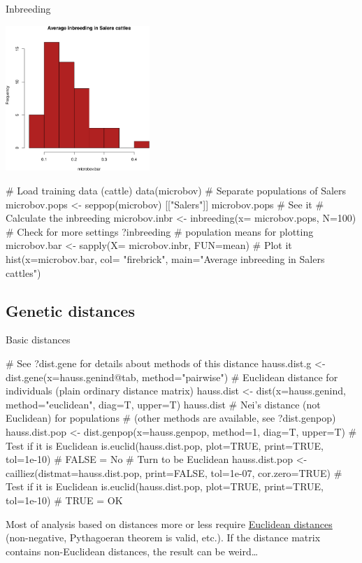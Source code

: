 \documentclass[compress, ucs, xelatex, 11pt, xcolor=svgnames,
  hyperref={
    bookmarks=true,
    unicode=true,
    colorlinks=true,
    pdftitle={Molecular data in R},
    plainpages=false,
    pdfauthor={Vojtech Zeisek},
    pdfsubject={Course about phylogeny and evolution in R},
    pdfcreator={XeLaTeX},
    pdfkeywords={R, evolution, phylogeny, molecular data},
    linkcolor=Tomato,
    anchorcolor=SaddleBrown,
    citecolor=Goldenrod,
    filecolor=DarkMagenta,
    menucolor=Sienna,
    urlcolor=DarkTurquoise,
    pdftex},
  url={hyphens, lowtilde} %
  ]{beamer}
\begin{document}
\begin{frame}[fragile]{Inbreeding}
\begin{multicols}{2}
  \includegraphics[height=5.5cm]{inbreeding.png}
  \begin{spluscode}
    # Load training data (cattle)
    data(microbov)
    # Separate populations of Salers
    microbov.pops <- seppop(microbov)
      [["Salers"]]
    microbov.pops # See it
    # Calculate the inbreeding
    microbov.inbr <- inbreeding(x=
      microbov.pops, N=100)
    # Check for more settings
    ?inbreeding
    # population means for plotting
    microbov.bar <- sapply(X=
      microbov.inbr, FUN=mean)
    # Plot it
    hist(x=microbov.bar, col=
      "firebrick", main="Average
      inbreeding in Salers cattles")
  \end{spluscode}
\end{multicols}

\end{frame}

\subsection{Genetic distances}

\begin{frame}[fragile]{Basic distances}
  \label{distances}
  \begin{spluscode}
    # See ?dist.gene for details about methods of this distance
    hauss.dist.g <- dist.gene(x=hauss.genind@tab, method="pairwise")
    # Euclidean distance for individuals (plain ordinary distance matrix)
    hauss.dist <- dist(x=hauss.genind, method="euclidean", diag=T, upper=T)
    hauss.dist
    # Nei's distance (not Euclidean) for populations
    # (other methods are available, see ?dist.genpop)
    hauss.dist.pop <- dist.genpop(x=hauss.genpop, method=1, diag=T, upper=T)
    # Test if it is Euclidean
    is.euclid(hauss.dist.pop, plot=TRUE, print=TRUE, tol=1e-10) # FALSE = No
    # Turn to be Euclidean
    hauss.dist.pop <- cailliez(distmat=hauss.dist.pop, print=FALSE,
      tol=1e-07, cor.zero=TRUE)
    # Test if it is Euclidean
    is.euclid(hauss.dist.pop, plot=TRUE, print=TRUE, tol=1e-10) # TRUE = OK
  \end{spluscode}
  \vfil
  Most of analysis based on distances more or less require \href{https://en.wikipedia.org/wiki/Euclidean_distance_matrix}{Euclidean distances} (non-negative, Pythagoeran theorem is valid, etc.). If the distance matrix contains non-Euclidean distances, the result can be weird\ldots
  \vfill
\end{frame}
\end{document}
